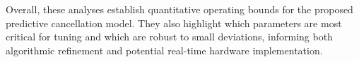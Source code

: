 Overall, these analyses establish quantitative operating bounds for the proposed predictive cancellation model. 
They also highlight which parameters are most critical for tuning and which are robust to small deviations, informing both algorithmic refinement and potential real-time hardware implementation.


